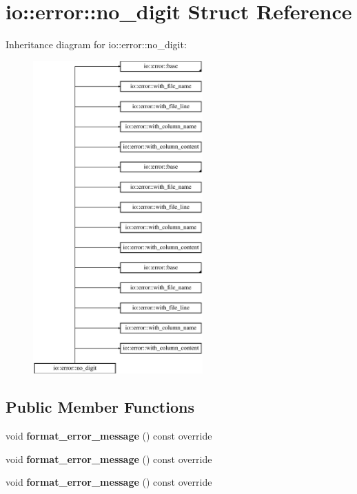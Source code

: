 \hypertarget{structio_1_1error_1_1no__digit}{}\section{io\+:\+:error\+:\+:no\+\_\+digit Struct Reference}
\label{structio_1_1error_1_1no__digit}
Inheritance diagram for io\+:\+:error\+:\+:no\+\_\+digit\+:\begin{figure}[H]
\begin{center}
\leavevmode
\includegraphics[height=12.000000cm]{da/d0e/structio_1_1error_1_1no__digit}
\end{center}
\end{figure}
\subsection*{Public Member Functions}
\begin{DoxyCompactItemize}
\item 
\mbox{\label{structio_1_1error_1_1no__digit_a32f2d2e2999496a43aae503f020234b1}} 
void {\bfseries format\+\_\+error\+\_\+message} () const override
\item 
\mbox{\label{structio_1_1error_1_1no__digit_a32f2d2e2999496a43aae503f020234b1}} 
void {\bfseries format\+\_\+error\+\_\+message} () const override
\item 
\mbox{\label{structio_1_1error_1_1no__digit_a32f2d2e2999496a43aae503f020234b1}} 
void {\bfseries format\+\_\+error\+\_\+message} () const override
\end{DoxyCompactItemize}
